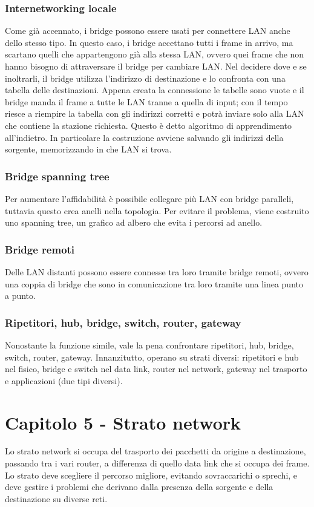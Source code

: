 \subsubsection{Internetworking locale}
Come già accennato, i bridge possono essere usati per connettere LAN anche dello stesso tipo.
In questo caso, i bridge accettano tutti i frame in arrivo, ma scartano quelli che appartengono già alla stessa LAN,
ovvero quei frame che non hanno bisogno di attraversare il bridge per cambiare LAN.
Nel decidere dove e se inoltrarli, il bridge utilizza l'indirizzo di destinazione e lo confronta con una tabella delle destinazioni.
Appena creata la connessione le tabelle sono vuote e il bridge manda il frame a tutte le LAN tranne a quella di input;
con il tempo riesce a riempire la tabella con gli indirizzi corretti e potrà inviare solo alla LAN che contiene la stazione richiesta.
Questo è detto algoritmo di apprendimento all'indietro.
In particolare la costruzione avviene salvando gli indirizzi della sorgente, memorizzando in che LAN si trova.

\subsubsection{Bridge spanning tree}
Per aumentare l'affidabilità è possibile collegare più LAN con bridge paralleli, tuttavia questo crea anelli nella topologia.
Per evitare il problema, viene costruito uno spanning tree, un grafico ad albero che evita i percorsi ad anello.

\subsubsection{Bridge remoti}
Delle LAN distanti possono essere connesse tra loro tramite bridge remoti,
ovvero una coppia di bridge che sono in comunicazione tra loro tramite una linea punto a punto.

\subsubsection{Ripetitori, hub, bridge, switch, router, gateway}
Nonostante la funzione simile, vale la pena confrontare ripetitori, hub, bridge, switch, router, gateway.
Innanzitutto, operano su strati diversi:
ripetitori e hub nel fisico, bridge e switch nel data link, router nel network, gateway nel trasporto e applicazioni (due tipi diversi).

\newpage
\section{Capitolo 5 - Strato network}
Lo strato network si occupa del trasporto dei pacchetti da origine a destinazione, passando tra i vari router, a differenza di quello data link che si occupa dei frame.
Lo strato deve scegliere il percorso migliore, evitando sovraccarichi o sprechi, e deve gestire i problemi che derivano dalla presenza della sorgente e della destinazione su diverse reti. 

